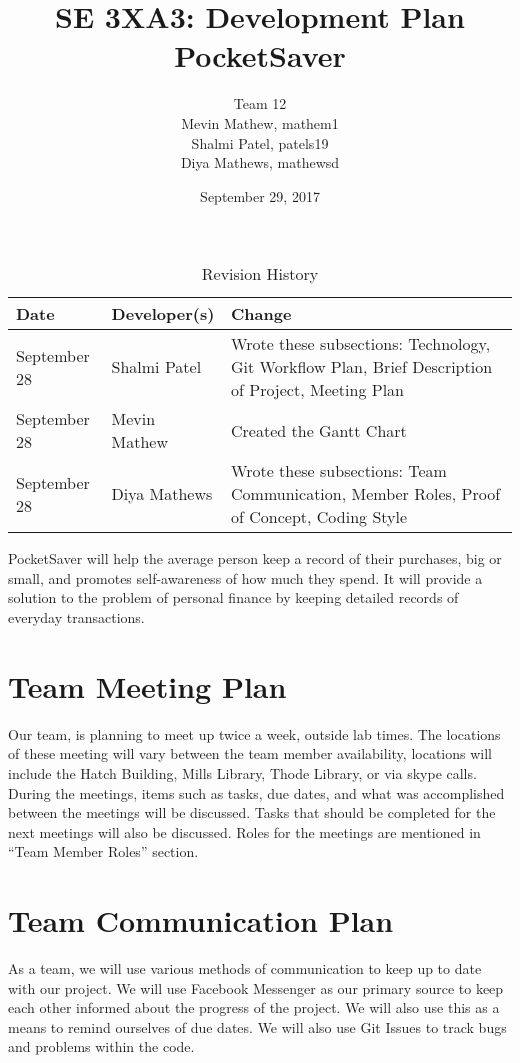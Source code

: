 \documentclass{article}
\title{SE 3XA3: Development Plan\\PocketSaver}
\author{Team 12
		\\ Mevin Mathew, mathem1
		\\ Shalmi Patel, patels19
		\\ Diya Mathews, mathewsd
}
\date{September 29, 2017}
\begin{document}
\begin{table}[hp]
\caption{Revision History} \label{TblRevisionHistory}
\begin{tabularx}{\textwidth}{llX}
\toprule
\textbf{Date} & \textbf{Developer(s)} & \textbf{Change}\\
\midrule
September 28 & Shalmi Patel & Wrote these subsections: Technology, Git Workflow Plan, Brief Description of Project, Meeting Plan\\
September 28 & Mevin Mathew & Created the Gantt Chart\\
September 28 & Diya Mathews & Wrote these subsections: Team Communication, Member Roles, Proof of Concept, Coding Style\\
\bottomrule
\end{tabularx}
\end{table}

\newpage

\maketitle

PocketSaver will help the average person keep a record of their purchases, big or small, and promotes self-awareness of how much they spend. It will provide a solution to the problem of personal finance by keeping detailed records of everyday transactions.

\section{Team Meeting Plan}
Our team, is planning to meet up twice a week, outside lab times. The locations of these meeting will vary between the team member availability, locations will include the Hatch Building, Mills Library, Thode Library, or via skype calls. During the meetings, items such as tasks, due dates, and what was accomplished between the meetings will be discussed. Tasks that should be completed for the next meetings will also be discussed. Roles for the meetings are mentioned in “Team Member Roles” section.

\section{Team Communication Plan}
As a team, we will use various methods of communication to keep up to date with our project. We will use Facebook Messenger as our primary source to keep each other informed about the progress of the project. We will also use this as a means to remind ourselves of due dates. We will also use Git Issues to track bugs and problems within the code.
\end{document}
